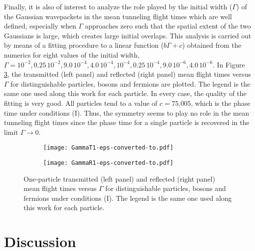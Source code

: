 \documentclass[preprint,aps]{revtex4}
\begin{document}
Finally, it is also of interest to analyze the role played by the initial width ($\Gamma$) of the Gaussian wavepackets in the mean tunneling flight times which are well defined, especially when $\Gamma$ approaches zero such that the spatial extent of the two Gaussians is large, which creates large initial overlaps. This analysis is carried out by means of a fitting procedure to a linear function ($b \Gamma + c$) obtained from the numerics for eight values of the initial width,
$\Gamma= 10^{-2}, 0.25 \, 10^{-2}, 9.0 \, 10^{-4}, 4.0 \, 10^{-4}, 10^{-4}, 0.25 \, 10^{-4}, 9.0 \, 10^{-6}, 4.0 \, 10^{-6}$.
In Figure \ref{fig3}, the transmitted  (left panel) and reflected (right panel) mean flight times versus $\Gamma$ for distinguishable particles, bosons and fermions
are plotted.  The legend is the same one used along this work for each particle. In every case, the quality of the fitting is very good. All particles tend to a value of  $c= 75.005$, which is the phase time under conditions (I). Thus, the symmetry seems to play no role in the mean tunneling flight times since the phase time for a single particle is recovered in the limit $\Gamma \rightarrow 0$. 

%
\begin{figure}
	\begin{subfigure}[t]{0.45\textwidth}
		\texttt{[image: GammaT1-eps-converted-to.pdf]}
		\label{fig2a}
	\end{subfigure}
	\hfill
	\begin{subfigure}[t]{0.45\textwidth}
		\texttt{[image: GammaR1-eps-converted-to.pdf]}
		\label{fig2b}
	\end{subfigure}
	
	
	\caption{One-particle transmitted  (left panel) and reflected (right panel)  mean flight times versus $\Gamma$ for distinguishable particles, bosons and fermions under conditions (I). The legend is the same one used along this work for each particle.} \label{fig3}
\end{figure} 




\section{Discussion}
\end{document}
